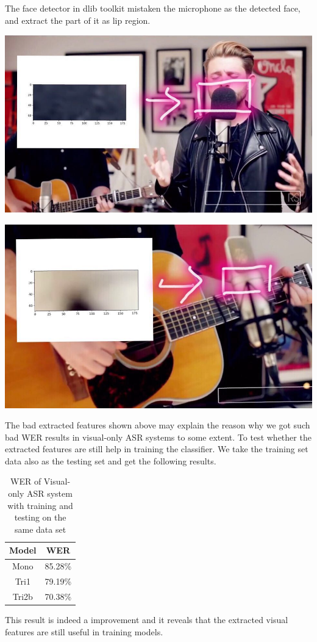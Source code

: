 The face detector in dlib toolkit mistaken the microphone as the detected face, and extract the part of it as lip region.
\begin{center}
\includegraphics[width=0.6\linewidth]{images/bad1.jpg}\\[1cm]
\label{img:bad1}
\end{center}
\begin{center}
\includegraphics[width=0.6\linewidth]{images/bad2.jpg}\\[1cm]
\label{img:bad2}
\end{center}
The bad extracted features shown above may explain the reason why we got such bad WER results in visual-only ASR systems to some extent. To test whether the extracted features are still help in training the classifier. We
take the training set data also as the testing set and get the following results.
\begin{table}[ht]
\center
\begin{tabular}{c|c}

Model & WER\\ \hline
Mono &85.28\% \\ 
Tri1 &79.19\% \\ 
Tri2b &70.38\% \\ 

\end{tabular}
\caption{WER of Visual-only ASR system with training and testing on the same data set}
\label{tab:AWER}
\end{table}
This result is indeed a improvement and it reveals that the extracted visual features are still useful in training models.
